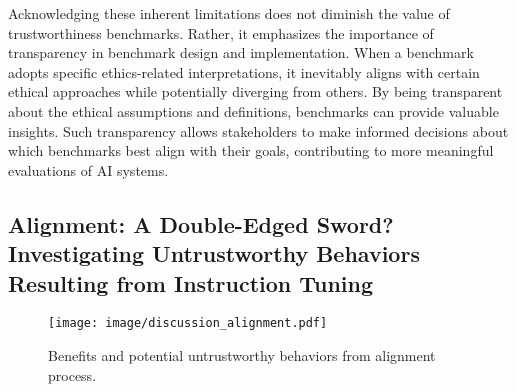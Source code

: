 

Acknowledging these inherent limitations does not diminish the value of trustworthiness benchmarks. Rather, it emphasizes the importance of transparency in benchmark design and implementation. When a benchmark adopts specific ethics-related interpretations, it inevitably aligns with certain ethical approaches while potentially diverging from others. By being transparent about the ethical assumptions and definitions, benchmarks can provide valuable insights. Such transparency allows stakeholders to make informed decisions about which benchmarks best align with their goals, contributing to more meaningful evaluations of AI systems.




\subsection{Alignment: A Double-Edged Sword? Investigating Untrustworthy Behaviors Resulting from Instruction Tuning}
\begin{figure}[h]
    \centering
    \texttt{[image: image/discussion\_alignment.pdf]}
    \caption{Benefits and potential untrustworthy behaviors from alignment process.} \vspace{+0.15in}
    \label{fig:alignment_double_edge}
\end{figure}


